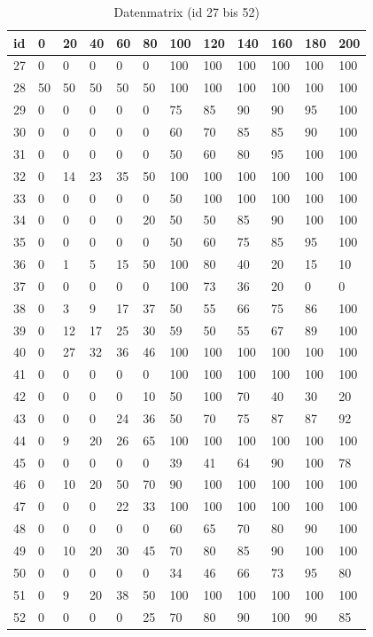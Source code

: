 \documentclass[a4paper]{thesis}
\begin{document}
\begin{table}[H]
\centering
\caption{Datenmatrix (id 27 bis 52)}
\begin{tabular}{l|lllllllllll}
id & 0 & 20 & 40 & 60 & 80 & 100 & 120 & 140 & 160 & 180 & 200\\
\hline
27 & 0 & 0 & 0 & 0 & 0 & 100 & 100 & 100 & 100 & 100 & 100 \\
28 & 50 & 50 & 50 & 50 & 50 & 100 & 100 & 100 & 100 & 100 & 100 \\
29 & 0 & 0 & 0 & 0 & 0 & 75 & 85 & 90 & 90 & 95 & 100 \\
30 & 0 & 0 & 0 & 0 & 0 & 60 & 70 & 85 & 85 & 90 & 100 \\
31 & 0 & 0 & 0 & 0 & 0 & 50 & 60 & 80 & 95 & 100 & 100 \\
32 & 0 & 14 & 23 & 35 & 50 & 100 & 100 & 100 & 100 & 100 & 100 \\
33 & 0 & 0 & 0 & 0 & 0 & 50 & 100 & 100 & 100 & 100 & 100 \\
34 & 0 & 0 & 0 & 0 & 20 & 50 & 50 & 85 & 90 & 100 & 100 \\
35 & 0 & 0 & 0 & 0 & 0 & 50 & 60 & 75 & 85 & 95 & 100 \\
36 & 0 & 1 & 5 & 15 & 50 & 100 & 80 & 40 & 20 & 15 & 10 \\
37 & 0 & 0 & 0 & 0 & 0 & 100 & 73 & 36 & 20 & 0 & 0 \\
38 & 0 & 3 & 9 & 17 & 37 & 50 & 55 & 66 & 75 & 86 & 100 \\
39 & 0 & 12 & 17 & 25 & 30 & 59 & 50 & 55 & 67 & 89 & 100 \\
40 & 0 & 27 & 32 & 36 & 46 & 100 & 100 & 100 & 100 & 100 & 100 \\
41 & 0 & 0 & 0 & 0 & 0 & 100 & 100 & 100 & 100 & 100 & 100 \\
42 & 0 & 0 & 0 & 0 & 10 & 50 & 100 & 70 & 40 & 30 & 20 \\
43 & 0 & 0 & 0 & 24 & 36 & 50 & 70 & 75 & 87 & 87 & 92 \\
44 & 0 & 9 & 20 & 26 & 65 & 100 & 100 & 100 & 100 & 100 & 100 \\
45 & 0 & 0 & 0 & 0 & 0 & 39 & 41 & 64 & 90 & 100 & 78 \\
46 & 0 & 10 & 20 & 50 & 70 & 90 & 100 & 100 & 100 & 100 & 100 \\
47 & 0 & 0 & 0 & 22 & 33 & 100 & 100 & 100 & 100 & 100 & 100 \\
48 & 0 & 0 & 0 & 0 & 0 & 60 & 65 & 70 & 80 & 90 & 100 \\
49 & 0 & 10 & 20 & 30 & 45 & 70 & 80 & 85 & 90 & 100 & 100 \\
50 & 0 & 0 & 0 & 0 & 0 & 34 & 46 & 66 & 73 & 95 & 80 \\
51 & 0 & 9 & 20 & 38 & 50 & 100 & 100 & 100 & 100 & 100 & 100 \\
52 & 0 & 0 & 0 & 0 & 25 & 70 & 80 & 90 & 100 & 90 & 85
\end{tabular}
\end{table}
\end{document}
